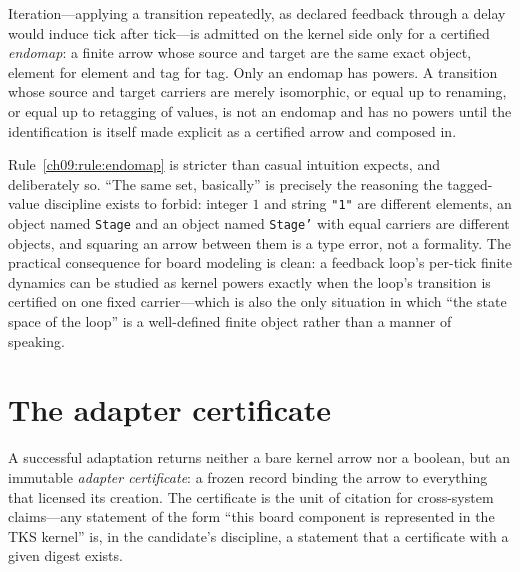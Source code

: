 \begin{ruleenv}\label{ch09:rule:endomap}
Iteration---applying a transition repeatedly, as declared feedback through a delay would induce tick after tick---is admitted on the kernel side only for a certified \emph{endomap}: a finite arrow whose source and target are the same exact object, element for element and tag for tag. Only an endomap has powers. A transition whose source and target carriers are merely isomorphic, or equal up to renaming, or equal up to retagging of values, is not an endomap and has no powers until the identification is itself made explicit as a certified arrow and composed in.
\end{ruleenv}

Rule~\ref{ch09:rule:endomap} is stricter than casual intuition expects, and deliberately so. ``The same set, basically'' is precisely the reasoning the tagged-value discipline exists to forbid: integer $1$ and string \texttt{"1"} are different elements, an object named \texttt{Stage} and an object named \texttt{Stage'} with equal carriers are different objects, and squaring an arrow between them is a type error, not a formality. The practical consequence for board modeling is clean: a feedback loop's per-tick finite dynamics can be studied as kernel powers exactly when the loop's transition is certified on one fixed carrier---which is also the only situation in which ``the state space of the loop'' is a well-defined finite object rather than a manner of speaking.

\section{The adapter certificate}\label{ch09:sec:certificate}

A successful adaptation returns neither a bare kernel arrow nor a boolean, but an immutable \emph{adapter certificate}: a frozen record binding the arrow to everything that licensed its creation. The certificate is the unit of citation for cross-system claims---any statement of the form ``this board component is represented in the TKS kernel'' is, in the candidate's discipline, a statement that a certificate with a given digest exists.

